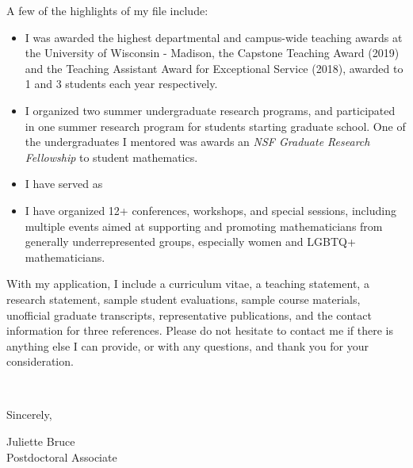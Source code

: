 \documentclass[11pt]{article}
\begin{document}
A few of the highlights of my file include:

\begin{itemize}[leftmargin=*]
\item I was awarded the highest departmental and campus-wide teaching awards at the University of Wisconsin - Madison, the Capstone Teaching Award (2019) and the Teaching Assistant Award for Exceptional Service (2018), awarded to 1 and 3 students each year respectively. 
\item I organized two summer undergraduate research programs, and participated in one summer research program for students starting graduate school. One of the undergraduates I mentored was awards an \textit{NSF Graduate Research Fellowship} to student mathematics.  
\item I have served as 
\item I have organized 12+ conferences, workshops, and special sessions, including multiple events aimed at supporting and promoting mathematicians from generally underrepresented groups, especially women and LGBTQ+ mathematicians. 

\end{itemize}

With my application, I include a curriculum vitae, a teaching statement, a research statement, sample student evaluations, sample course materials, unofficial graduate transcripts, representative publications, and the contact information for three references. Please do not hesitate to contact me if there is anything else I can provide, or with any questions, and thank you for your consideration. 

\vspace{24pt}
\noindent
\begin{minipage}{0.99\textwidth}
\begin{minipage}{0.69\textwidth}
\textcolor{white}{.}
\end{minipage}
\begin{minipage}{0.29\textwidth}
Sincerely, 

\vspace{20pt}
Juliette Bruce\\
Postdoctoral Associate\end{minipage}
\end{minipage}

\end{document}
